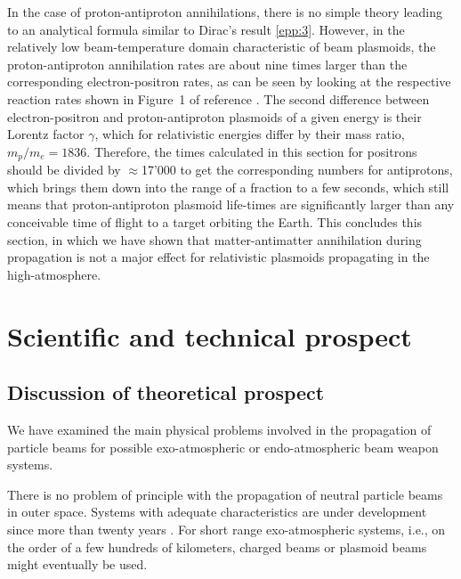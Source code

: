 \documentclass [12pt,a4paper,     ]{report} %
\begin{document}
   In the case of proton-antiproton annihilations, there is no simple theory leading to an analytical formula similar to Dirac's result \eqref{epp:3}.  However, in the relatively low beam-temperature domain characteristic of beam plasmoids, the proton-antiproton annihilation rates are about nine times larger than the corresponding electron-positron rates, as can be seen by looking at the respective reaction rates shown in Figure~1 of reference \cite{GSPON1986A}. The second difference between electron-positron and proton-antiproton plasmoids of a given energy is their Lorentz factor $\gamma$, which for relativistic energies differ by their mass ratio, $m_p/m_e=1836$.  Therefore, the times calculated in this section for positrons should be divided by $\approx$17'000 to get the corresponding numbers for antiprotons, which brings them down into the range of a fraction to a few seconds, which still means that proton-antiproton plasmoid life-times are significantly larger than any conceivable time of flight to a target orbiting the Earth.  This concludes this section, in which we have shown that matter-antimatter annihilation during propagation is not a major effect for relativistic plasmoids propagating in the high-atmosphere. 






\chapter{Scientific and technical prospect}
\label{sci:0}



\section{Discussion of theoretical prospect}
\label{the:0}



	We have examined the main physical problems involved in the propagation of particle beams for possible exo-atmospheric or endo-atmospheric beam weapon systems.

	There is no problem of principle with the propagation of neutral particle beams in outer space.  Systems with adequate characteristics are under development since more than twenty years \cite{KEEFE1981-}.  For short range exo-atmospheric systems, i.e., on the order of a few hundreds of kilometers, charged beams or plasmoid beams might eventually be used.
\end{document}

